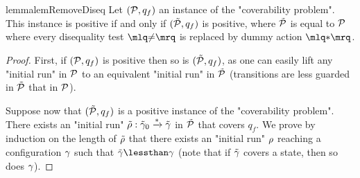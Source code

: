 
\begin{restatable}{lemma}{lemRemoveDiseq}
	\label{lem:removing_diseq_tests}
	Let $(\mathcal{P}, q_f)$ an instance of the "coverability problem". This instance is positive if and only if $(\tilde{\mathcal{P}}, q_f)$ is positive, where $\tilde{\mathcal{P}}$ is equal to $\mathcal{P}$ where every disequality test $\quotemarks{\diseqtestact}$ is replaced by dummy action $\quotemarks{\dummyact}$.  
\end{restatable}

\begin{proof}
	First, if $(\mathcal{P}, q_f)$ is positive then so is $(\tilde{\mathcal{P}}, q_f)$, as one can easily lift any "initial run" in $\mathcal{P}$ to an equivalent "initial run" in $\tilde{\mathcal{P}}$ (transitions are less guarded  in $\tilde{\mathcal{P}}$ that in $\mathcal{P}$). 
	
	Suppose now that $(\tilde{\mathcal{P}}, q_f)$ is a positive instance of the "coverability problem". There exists an "initial run" $\tilde{\rho}: \tilde{\gamma}_0 \xrightarrow{*} \tilde{\gamma}$ in $\tilde{\mathcal{P}}$ that covers $q_f$. We prove by induction on the length of $\tilde{\rho}$ that there exists an "initial run" $\rho$ reaching a configuration $\gamma$ such that $\tilde{\config} \lessthan \config$ (note that if $\tilde{\gamma}$ covers a state, then so does $\gamma$). 
	

\end{proof}
